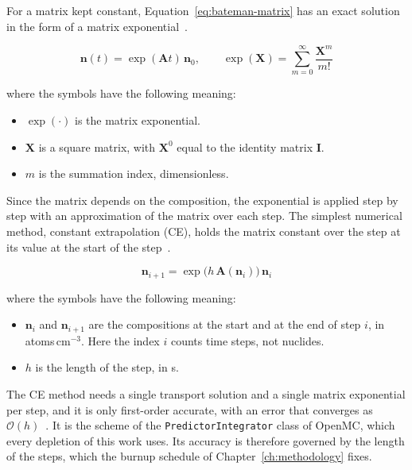 For a matrix kept constant, Equation~\eqref{eq:bateman-matrix} has an
exact solution in the form of a matrix
exponential~\cite{romano_2021_depletion}.

\begin{equation}
\mathbf{n}(t) = \exp(\mathbf{A}t)\,\mathbf{n}_0,
\qquad
\exp(\mathbf{X}) = \sum_{m=0}^{\infty}\frac{\mathbf{X}^{m}}{m!}
\label{eq:mat-exp}
\end{equation}

\noindent where the symbols have the following meaning:

\begin{itemize}
  \item $\exp(\cdot)$ is the matrix exponential.

  \item $\mathbf{X}$ is a square matrix, with $\mathbf{X}^{0}$ equal to
        the identity matrix $\mathbf{I}$.

  \item $m$ is the summation index, dimensionless.
\end{itemize}

Since the matrix depends on the composition, the exponential is applied
step by step with an approximation of the matrix over each step. The
simplest numerical method, constant extrapolation (CE), holds the matrix
constant over the step at its value at the start of the
step~\cite{romano_2021_depletion}.

\begin{equation}
\mathbf{n}_{i+1} = \exp\!\big(h\,\mathbf{A}(\mathbf{n}_i)\big)\,\mathbf{n}_i
\label{eq:dep-ce}
\end{equation}

\noindent where the symbols have the following meaning:

\begin{itemize}
  \item $\mathbf{n}_i$ and $\mathbf{n}_{i+1}$ are the compositions at
        the start and at the end of step $i$, in atoms\,cm$^{-3}$. Here
        the index $i$ counts time steps, not nuclides.

  \item $h$ is the length of the step, in s.
\end{itemize}

The CE method needs a single transport solution and a single matrix
exponential per step, and it is only first-order accurate, with an error
that converges as $\mathcal{O}(h)$~\cite{romano_2021_depletion}. It is
the scheme of the \texttt{PredictorIntegrator} class of OpenMC, which
every depletion of this work uses. Its accuracy is therefore governed by
the length of the steps, which the burnup schedule of
Chapter~\ref{ch:methodology} fixes.

